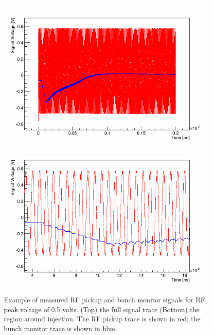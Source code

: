 \documentclass{paper}
\begin{document}
\begin{figure}
	\centering
		\includegraphics[width=\textwidth]{images/V=1_03_signals}
		\includegraphics[width=\textwidth]{images/V=1_03_signals_zoom}
	\caption{Example of measured RF pickup and bunch monitor signals for RF peak 
           voltage of 0.5 volts. (Top) the full signal trace (Bottom) the 
           region around injection.
           The RF pickup trace is shown in red; the bunch monitor trace is shown
           in blue.}
	\label{fig:signals}
\end{figure}
\end{document}
